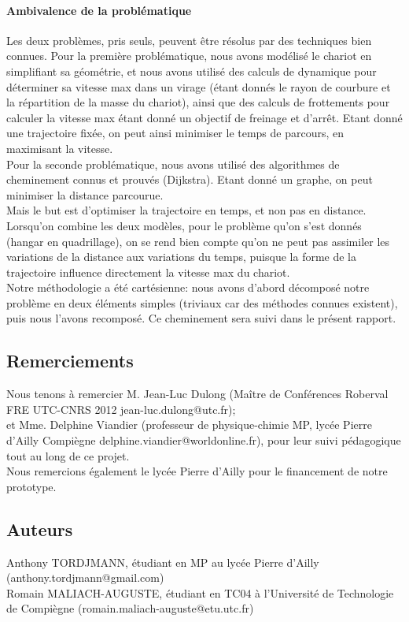 \paragraph{Ambivalence de la problématique}
Les deux problèmes, pris seuls, peuvent être résolus par des techniques bien connues. Pour la première problématique, nous avons modélisé le chariot en simplifiant sa géométrie, et nous avons utilisé des calculs de dynamique pour déterminer sa vitesse max dans un virage (étant donnés le rayon de courbure et la répartition de la masse du chariot), ainsi que des calculs de frottements pour calculer la vitesse max étant donné un objectif de freinage et d'arrêt. Etant donné une trajectoire fixée, on peut ainsi minimiser le temps de parcours, en maximisant la vitesse.\\
Pour la seconde problématique, nous avons utilisé des algorithmes de cheminement connus et prouvés (Dijkstra). Etant donné un graphe, on peut minimiser la distance parcourue.\\
Mais le but est d'optimiser la trajectoire en temps, et non pas en distance. Lorsqu'on combine les deux modèles, pour le problème qu'on s'est donnés (hangar en quadrillage), on se rend bien compte qu'on ne peut pas assimiler les variations de la distance aux variations du temps, puisque la forme de la trajectoire influence directement la vitesse max du chariot.\\
Notre méthodologie a été cartésienne: nous avons d'abord décomposé notre problème en deux éléments simples (triviaux car des méthodes connues existent), puis nous l'avons recomposé. Ce cheminement sera suivi dans le présent rapport.

\subsection{Remerciements}
Nous tenons à remercier M. Jean-Luc Dulong (Maître de Conférences Roberval FRE UTC-CNRS 2012 jean-luc.dulong@utc.fr);\\
et Mme. Delphine Viandier (professeur de physique-chimie MP, lycée Pierre d'Ailly Compiègne delphine.viandier@worldonline.fr), pour leur suivi pédagogique tout au long de ce projet.\\
Nous remercions également le lycée Pierre d'Ailly pour le financement de notre prototype.\\
\subsection{Auteurs}
Anthony TORDJMANN, étudiant en MP au lycée Pierre d'Ailly (anthony.tordjmann@gmail.com)\\
Romain MALIACH-AUGUSTE, étudiant en TC04 à l'Université de Technologie de Compiègne (romain.maliach-auguste@etu.utc.fr)
